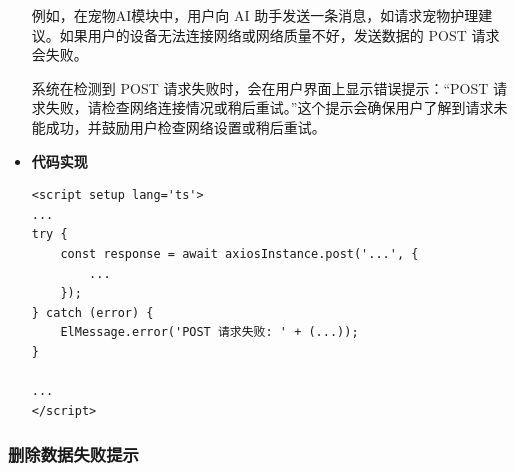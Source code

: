 \begin{itemize}
	例如，在宠物AI模块中，用户向 AI 助手发送一条消息，如请求宠物护理建议。如果用户的设备无法连接网络或网络质量不好，发送数据的 POST 请求会失败。
	
	系统在检测到 POST 请求失败时，会在用户界面上显示错误提示：“POST 请求失败，请检查网络连接情况或稍后重试。”这个提示会确保用户了解到请求未能成功，并鼓励用户检查网络设置或稍后重试。
	
	\item \textbf{代码实现}
	
	\begin{verbatim}
<script setup lang='ts'>
...
try {
	const response = await axiosInstance.post('...', {
		...
	});
} catch (error) {
	ElMessage.error('POST 请求失败: ' + (...));
}

...
</script>
	\end{verbatim}
\end{itemize}

\subsubsection{删除数据失败提示}

